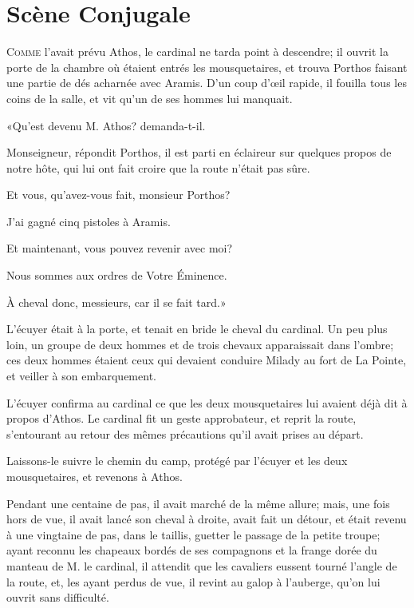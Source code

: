 
\chapter{Scène Conjugale}

\lettrine{C}{omme} l'avait prévu Athos, le cardinal ne tarda point à descendre; il ouvrit la porte de la chambre où étaient entrés les mousquetaires, et trouva Porthos faisant une partie de dés acharnée avec Aramis. D'un coup d'œil rapide, il fouilla tous les coins de la salle, et vit qu'un de ses hommes lui manquait. 

«Qu'est devenu M. Athos? demanda-t-il. 

\speak  Monseigneur, répondit Porthos, il est parti en éclaireur sur quelques propos de notre hôte, qui lui ont fait croire que la route n'était pas sûre. 

\speak  Et vous, qu'avez-vous fait, monsieur Porthos? 

\speak  J'ai gagné cinq pistoles à Aramis. 

\speak  Et maintenant, vous pouvez revenir avec moi? 

\speak  Nous sommes aux ordres de Votre Éminence. 

\speak  À cheval donc, messieurs, car il se fait tard.» 

L'écuyer était à la porte, et tenait en bride le cheval du cardinal. Un peu plus loin, un groupe de deux hommes et de trois chevaux apparaissait dans l'ombre; ces deux hommes étaient ceux qui devaient conduire Milady au fort de La Pointe, et veiller à son embarquement. 

L'écuyer confirma au cardinal ce que les deux mousquetaires lui avaient déjà dit à propos d'Athos. Le cardinal fit un geste approbateur, et reprit la route, s'entourant au retour des mêmes précautions qu'il avait prises au départ. 

Laissons-le suivre le chemin du camp, protégé par l'écuyer et les deux mousquetaires, et revenons à Athos. 

Pendant une centaine de pas, il avait marché de la même allure; mais, une fois hors de vue, il avait lancé son cheval à droite, avait fait un détour, et était revenu à une vingtaine de pas, dans le taillis, guetter le passage de la petite troupe; ayant reconnu les chapeaux bordés de ses compagnons et la frange dorée du manteau de M. le cardinal, il attendit que les cavaliers eussent tourné l'angle de la route, et, les ayant perdus de vue, il revint au galop à l'auberge, qu'on lui ouvrit sans difficulté. 

